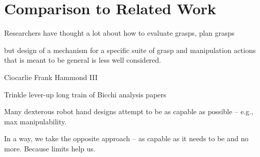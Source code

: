 \section{Comparison to Related Work}

Researchers have thought a lot about how to evaluate grasps, plan grasps

but design of a mechanism for a specific suite of grasp and manipulation actions that is meant to be general is less well considered.

Ciocarlie
Frank Hammond III

Trinkle lever-up
long train of Bicchi analysis papers


Many dexterous robot hand designs attempt to be as capable as possible -- e.g., max manipulability.  

In a way, we take the opposite approach -- as capable as it needs to be and no more.   Because limits help us.

